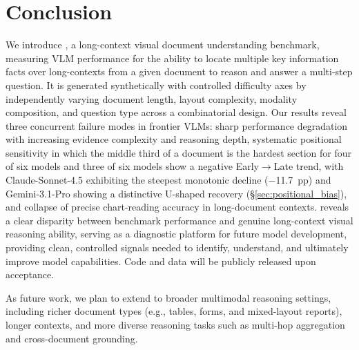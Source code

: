 \section{Conclusion}
\label{sec:conclusion}

We introduce \synthdocbench{}, a long-context visual document understanding benchmark, measuring VLM performance for the ability to locate multiple key information facts over long-contexts from a given document to reason and answer a multi-step question. It is generated synthetically with controlled difficulty axes by independently varying document length, layout complexity, modality composition, and question type across a combinatorial design. Our results reveal three concurrent failure modes in frontier VLMs: sharp performance degradation with increasing evidence complexity and reasoning depth, systematic positional sensitivity in which the middle third of a document is the hardest section for four of six models and three of six models show a negative Early$\to$Late trend, with Claude-Sonnet-4.5 exhibiting the steepest monotonic decline ($-$11.7~pp) and Gemini-3.1-Pro showing a distinctive U-shaped recovery (§\ref{sec:positional_bias}), and collapse of precise chart-reading accuracy in long-document contexts. \synthdocbench{} reveals a clear disparity between benchmark performance and genuine long-context visual reasoning ability, serving as a diagnostic platform for future model development, providing clean, controlled signals needed to identify, understand, and ultimately improve model capabilities. Code and data will be publicly released upon acceptance.

As future work, we plan to extend \synthdocbench{} to broader multimodal reasoning settings, including richer document types (e.g., tables, forms, and mixed-layout reports), longer contexts, and more diverse reasoning tasks such as multi-hop aggregation and cross-document grounding.
